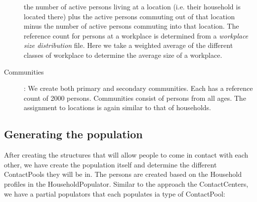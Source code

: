 \begin{description}
        the number of active persons living at a location (i.e. their household is located there)
        plus the active persons commuting out of that location minus the number of active persons
        commuting into that location. 
        The reference count for persons at a workplace is determined from a \emph{workplace size distribution} file.
        Here we take a weighted average of the different classes of workplace to determine
        the average size of a workplace.
    \item[Communities]:
        We create both primary and secondary communities. Each has a  reference count of 2000 persons. 
        Communities consist of persons from all ages. 
        The assignment to locations is again similar to that of households.
\end{description}

\subsection{Generating the population}
\label{subsection:genpop}
After creating the structures that will allow people to come in contact with each other, we have create the population itself and determine the different ContactPools they will be in. The persons are created based on the Household profiles in the HouseholdPopulator. Similar to the approach the ContactCenters, we have a partial populators that 
each populates ia type of ContactPool:

